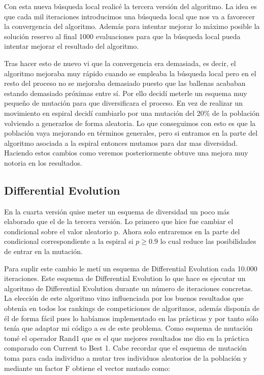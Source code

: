 \documentclass[12pt,a4paper]{article}
\begin{document}
	Con esta nueva búsqueda local realicé la tercera versión del algoritmo. La idea es que cada mil iteraciones introducimos una búsqueda local que nos va a favorecer la convergencia del algoritmo. Además para intentar mejorar lo máximo posible la solución reservo al final 1000 evaluaciones para que la búsqueda local pueda intentar mejorar el resultado del algoritmo. 
	
	Tras hacer esto de nuevo vi que la convergencia era demasiada, es decir, el algoritmo mejoraba muy rápido cuando se empleaba la búsqueda local pero en el resto del proceso no se mejoraba demasiado puesto que las ballenas acababan estando demasiado próximas entre sí. Por ello decidí meterle un esquema muy pequeño de mutación para que diversificara el proceso. En vez de realizar un movimiento en espiral decidí cambiarlo por una mutación del 20\% de la población volviendo a generarlos de forma aleatoria. Lo que conseguimos con esto es que la población vaya mejorando en términos generales, pero si entramos en la parte del algoritmo asociada a la espiral entonces mutamos para dar mas diversidad. Haciendo estos cambios como veremos posteriormente obtuve una mejora muy notoria en los resultados.
	
	\subsection{Differential Evolution}
	
    En la cuarta versión quise meter un esquema de diversidad un poco más elaborado que el de la tercera versión. Lo primero que hice fue cambiar el condicional sobre el valor aleatorio p. Ahora solo entraremos en la parte del condicional correspondiente a la espiral si $p\geq0.9$ lo cual reduce las posibilidades de entrar en la mutación.
    
    Para suplir este cambio le metí un esquema de Differential Evolution cada 10.000 iteraciones. Este esquema de Differential Evolution lo que hace es ejecutar un algoritmo de Differential Evolution durante un número de iteraciones concretas. La elección de este algoritmo vino influenciada por los buenos resultados que obtenía en todos los rankings de competiciones de algoritmos, además disponía de él de forma fácil pues lo habíamos implementado en las prácticas y por tanto sólo tenía que adaptar mi código a es de este problema. Como esquema de mutación tomé el operador Rand1 que es el que mejores resultados me dio en la práctica comparado con Current to Best 1. Cabe recordar que el esquema de mutación toma para cada individuo a mutar tres individuos aleatorios de la población y mediante un factor F obtiene el vector mutado como:
    
\end{document}
